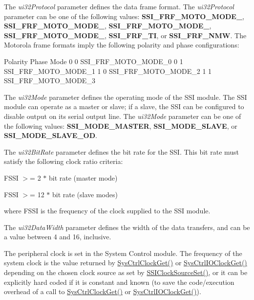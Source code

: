 The {\itshape ui32\+Protocol} parameter defines the data frame format. The {\itshape ui32\+Protocol} parameter can be one of the following values\+: {\bfseries S\+S\+I\+\_\+\+F\+R\+F\+\_\+\+M\+O\+T\+O\+\_\+\+M\+O\+D\+E\+\_}, {\bfseries S\+S\+I\+\_\+\+F\+R\+F\+\_\+\+M\+O\+T\+O\+\_\+\+M\+O\+D\+E\+\_}, {\bfseries S\+S\+I\+\_\+\+F\+R\+F\+\_\+\+M\+O\+T\+O\+\_\+\+M\+O\+D\+E\+\_}, {\bfseries S\+S\+I\+\_\+\+F\+R\+F\+\_\+\+M\+O\+T\+O\+\_\+\+M\+O\+D\+E\+\_}, {\bfseries S\+S\+I\+\_\+\+F\+R\+F\+\_\+\+TI}, or {\bfseries S\+S\+I\+\_\+\+F\+R\+F\+\_\+\+N\+MW}. The Motorola frame formats imply the following polarity and phase configurations\+:


\begin{DoxyPre}
Polarity Phase       Mode
  0       0   SSI\_FRF\_MOTO\_MODE\_0
  0       1   SSI\_FRF\_MOTO\_MODE\_1
  1       0   SSI\_FRF\_MOTO\_MODE\_2
  1       1   SSI\_FRF\_MOTO\_MODE\_3
\end{DoxyPre}


The {\itshape ui32\+Mode} parameter defines the operating mode of the S\+SI module. The S\+SI module can operate as a master or slave; if a slave, the S\+SI can be configured to disable output on its serial output line. The {\itshape ui32\+Mode} parameter can be one of the following values\+: {\bfseries S\+S\+I\+\_\+\+M\+O\+D\+E\+\_\+\+M\+A\+S\+T\+ER}, {\bfseries S\+S\+I\+\_\+\+M\+O\+D\+E\+\_\+\+S\+L\+A\+VE}, or {\bfseries S\+S\+I\+\_\+\+M\+O\+D\+E\+\_\+\+S\+L\+A\+V\+E\+\_\+\+OD}.

The {\itshape ui32\+Bit\+Rate} parameter defines the bit rate for the S\+SI. This bit rate must satisfy the following clock ratio criteria\+:


\begin{DoxyItemize}
\item F\+S\+SI $>$= 2 $\ast$ bit rate (master mode)
\item F\+S\+SI $>$= 12 $\ast$ bit rate (slave modes)
\end{DoxyItemize}

where F\+S\+SI is the frequency of the clock supplied to the S\+SI module.

The {\itshape ui32\+Data\+Width} parameter defines the width of the data transfers, and can be a value between 4 and 16, inclusive.

The peripheral clock is set in the System Control module. The frequency of the system clock is the value returned by \hyperlink{group__sysctl__api_ga9ad809b6591f052d72dde7b1fb1f6eed}{Sys\+Ctrl\+Clock\+Get()} or \hyperlink{group__sysctl__api_ga61cdfa03e9a592cfad5ef7ba81595046}{Sys\+Ctrl\+I\+O\+Clock\+Get()} depending on the chosen clock source as set by \hyperlink{group__ssi__api_gaaaaf45725698f4c264582a58c9a359bb}{S\+S\+I\+Clock\+Source\+Set()}, or it can be explicitly hard coded if it is constant and known (to save the code/execution overhead of a call to \hyperlink{group__sysctl__api_ga9ad809b6591f052d72dde7b1fb1f6eed}{Sys\+Ctrl\+Clock\+Get()} or \hyperlink{group__sysctl__api_ga61cdfa03e9a592cfad5ef7ba81595046}{Sys\+Ctrl\+I\+O\+Clock\+Get()}).

